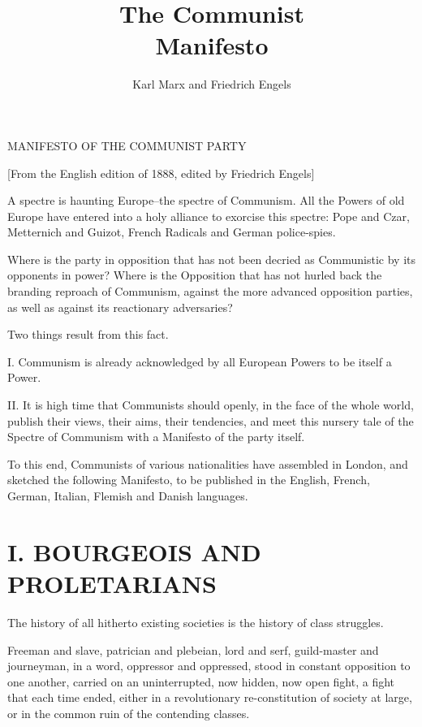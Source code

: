 \documentclass[11pt]{book}
\title{The Communist\protect\\\noindent Manifesto}
\author{Karl Marx and Friedrich Engels}
\begin{document}
\maketitle


\tableofcontents







\mainmatter

MANIFESTO OF THE COMMUNIST PARTY

[From the English edition of 1888, edited by Friedrich Engels]


A spectre is haunting Europe--the spectre of Communism.
All the Powers of old Europe have entered into a holy alliance to
exorcise this spectre: Pope and Czar, Metternich and Guizot,
French Radicals and German police-spies.

Where is the party in opposition that has not been decried as
Communistic by its opponents in power?  Where is the Opposition
that has not hurled back the branding reproach of Communism,
against the more advanced opposition parties, as well as against
its reactionary adversaries?

Two things result from this fact.

I.  Communism is already acknowledged by all European Powers
to be itself a Power.

II.  It is high time that Communists should openly, in the
face of the whole world, publish their views, their aims, their
tendencies, and meet this nursery tale of the Spectre of
Communism with a Manifesto of the party itself.

To this end, Communists of various nationalities have
assembled in London, and sketched the following Manifesto, to be
published in the English, French, German, Italian, Flemish and
Danish languages.



\chapter*{I.  BOURGEOIS AND PROLETARIANS}

The history of all hitherto existing societies is the history
of class struggles.

Freeman and slave, patrician and plebeian, lord and serf,
guild-master and journeyman, in a word, oppressor and oppressed,
stood in constant opposition to one another, carried on an
uninterrupted, now hidden, now open fight, a fight that each time
ended, either in a revolutionary re-constitution of society at
large, or in the common ruin of the contending classes.
\end{document}
